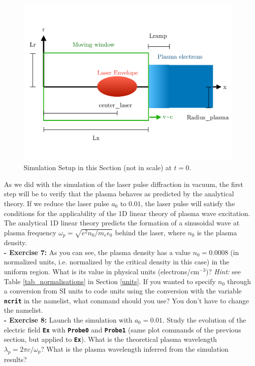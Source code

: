 \documentclass[a4paper,12pt]{extarticle}
\newcommand{\commandline}[1]{\texttt{\textbf{#1}}}
\begin{document}
\begin{figure}[h!]
  \begin{center}
  \includegraphics[scale=0.3]{Schema_Simulation_2.pdf}
  \end{center}
  \caption{Simulation Setup in this Section (not in scale) at $t=0$.}
  \label{Schema2}
\end{figure}

As we did with the simulation of the laser pulse diffraction in vacuum,  the first step will be to verify that the plasma behaves as predicted by the analytical theory. If we reduce the laser pulse $a_0$ to $0.01$, the laser pulse will satisfy the conditions for the applicability of the 1D linear theory of plasma wave excitation. The  analytical 1D linear theory predicts the formation of a sinusoidal wave at plasma frequency $\omega_p=\sqrt{e^2n_0/m_e\epsilon_0}$ behind the laser, where $n_0$ is the plasma density.\\

\textbf{ - Exercise 7:} As you can see, the plasma density has a value $n_0=0.0008$ (in normalized units, i.e.  normalized by the critical density in this case) in the uniform region.  What is its value in physical units (electrons/cm$^{-3}$)? \textit{Hint:} see Table \ref{tab_normalisations} in Section \ref{units}. If you wanted to specify $n_0$ through a conversion from SI units to code units using the conversion with the variable \commandline{ncrit} in the namelist, what command should you use? You don't have to change the namelist. \\

\textbf{ - Exercise 8:} Launch the simulation with $a_0=0.01$. Study the evolution of the electric field \commandline{Ex} with \commandline{Probe0} and \commandline{Probe1} (same plot commands of the previous section, but applied to \commandline{Ex}). What is the theoretical plasma wavelength $\lambda_p=2\pi c/\omega_p$? What is the plasma wavelength inferred from the simulation results?\\
\end{document}
